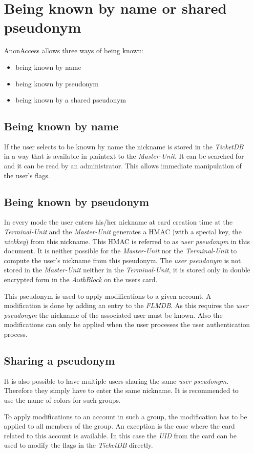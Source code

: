 \section{Being known by name or shared pseudonym}
AnonAccess allows three ways of being known:
\begin{itemize}
\item being known by name
\item being known by pseudonym
\item being known by a shared pseudonym
\end{itemize}

\subsection{Being known by name}
If the user selects to be known by name the nickname is stored in the \textit{TicketDB} in a way that is available in plaintext to the \textit{Master-Unit}. It can be searched for and it can be read by an administrator. This allows immediate manipulation of the user's flags.

\subsection{Being known by pseudonym}
In every mode the user enters his/her nickname at card creation time at the \textit{Terminal-Unit} and the \textit{Master-Unit} generates a HMAC (with a special key, the \textit{nickkey}) from this nickname. This HMAC is referred to as \textit{user pseudonym} in this document. It is neither possible for the \textit{Master-Unit} nor the \textit{Terminal-Unit} to compute the user's nickname from this pseudonym. The \textit{user pseudonym} is not stored in the \textit{Master-Unit} neither in the \textit{Terminal-Unit}, it is stored only in double encrypted form in the \textit{AuthBlock} on the users card.

This pseudonym is used to apply modifications to a given account. A modification is done by adding an entry to the \textit{FLMDB}. As this requires the \textit{user pseudonym} the nickname of the associated user must be known. Also the modifications can only be applied when the user processes the user authentication process.

\subsection{Sharing a pseudonym}
It is also possible to have multiple users sharing the same \textit{user pseudonym}. Therefore they simply have to enter the same nickname. It is recommended to use the name of colors for such groups.

To apply modifications to an account in such a group, the modification has to be applied to all members of the group. An exception is the case where the card related to this account is available. In this case the \textit{UID} from the card can be used to modify the flags in the \textit{TicketDB} directly.
